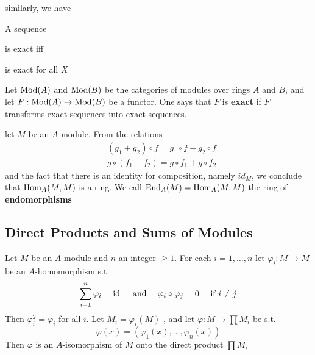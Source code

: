 \documentclass[11pt]{article}
\begin{document}
similarly, we have
\begin{proposition}[]
A sequence
\begin{center}\end{center}
is exact iff
\begin{center}\end{center}
is exact for all \(X\)
\end{proposition}

Let \(\operatorname{Mod}(A)\) and \(\operatorname{Mod}(B)\) be the categories of modules over rings \(A\) and \(B\), and
let \(F:\operatorname{Mod}(A)\to\operatorname{Mod}(B)\) be a functor. One says that \(F\) is \textbf{exact} if \(F\) transforms exact
sequences into exact sequences.

let \(M\) be an \(A\)-module. From the relations
\begin{align*}
&(g_1+g_2)\circ f=g_1\circ f+g_2\circ f\\
&g\circ(f_1+f_2)=g\circ f_1+g\circ f_2
\end{align*}
and the fact that there is an identity for composition, namely \(id_M\), we conclude
that \(\operatorname{Hom}_A(M,M)\) is a ring. We call \(\operatorname{End}_A(M)=\operatorname{Hom}_A(M,M)\) the ring of \textbf{endomorphisms}

\subsection{Direct Products and Sums of Modules}
\label{sec:org28d88d6}
\begin{proposition}[]
Let \(M\) be an \(A\)-module and \(n\) an integer \(\ge 1\). For each \(i=1,\dots,n\) let \(\varphi_i:M\to M\)
be an \(A\)-homomorphism s.t.
\begin{equation*}
\sum_{i=1}^n\varphi_i=\operatorname{id} \quad\text{ and }\quad\varphi_i\circ\varphi_j=0\quad \text{ if }i\neq j
\end{equation*}
Then \(\varphi_i^2=\varphi_i\) for all \(i\). Let \(M_i=\varphi_i(M)\) , and let \(\varphi:M\to\prod M_i\) be s.t.
\begin{equation*}
\varphi(x)=(\varphi_1(x),\dots,\varphi_n(x))
\end{equation*}
Then \(\varphi\) is an \(A\)-isomorphism of \(M\) onto the direct product \(\prod M_i\)
\end{proposition}
\end{document}
